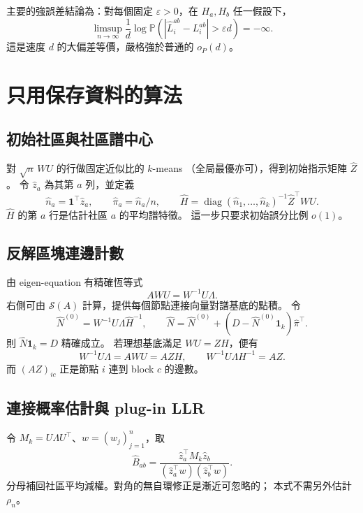 \documentclass[11pt,a4paper]{article}
\theoremstyle{zhplain}
\numberwithin{equation}{section}
\newcommand{\PP}{\mathbb P}
\newcommand{\one}{\mathbf 1}
\newcommand{\diag}{\operatorname{diag}}
\newcommand{\cS}{\mathcal S}
\begin{document}
主要的強誤差結論為：對每個固定 \(\varepsilon>0\)，在 \(H_a,H_b\) 任一假設下，
\begin{equation}
 \limsup_{n\to\infty}\frac1d
 \log\PP\!\left(
   |\widehat L_i^{ab}-L_i^{ab}|>\varepsilon d
 \right)=-\infty.
 \label{eq:exp-equivalence}
\end{equation}
這是速度 \(d\) 的大偏差等價，嚴格強於普通的 \(o_P(d)\)。

\section{只用保存資料的算法}
\label{sec:algorithm}

\subsection{初始社區與社區譜中心}
對 \(\sqrt n\,WU\) 的行做固定近似比的 \(k\)-means
（全局最優亦可），得到初始指示矩陣 \(\hat Z\)。
令 \(\hat z_a\) 為其第 \(a\) 列，並定義
\begin{equation}
 \hat n_a=\one^\top\hat z_a,\qquad
 \hat\pi_a=\hat n_a/n,\qquad
 \hat H=\diag(\hat n_1,\ldots,\hat n_k)^{-1}\hat Z^\top WU.
 \label{eq:centroid}
\end{equation}
\(\hat H\) 的第 \(a\) 行是估計社區 \(a\) 的平均譜特徵。
這一步只要求初始誤分比例 \(o(1)\)。

\subsection{反解區塊連邊計數}
由 eigen-equation 有精確恆等式
\begin{equation}
 AWU=W^{-1}U\Lambda.
 \label{eq:eigen-identity}
\end{equation}
右側可由 \(\cS(A)\) 計算，提供每個節點連接向量對譜基底的點積。
令
\begin{equation}
 \hat N^{(0)}=W^{-1}U\Lambda\hat H^{-1},
 \qquad
 \hat N=\hat N^{(0)}
       +(D-\hat N^{(0)}\one_k)\hat\pi^\top.
 \label{eq:counts-estimator}
\end{equation}
則 \(\hat N\one_k=D\) 精確成立。
若理想基底滿足 \(WU=ZH\)，便有
\[
 W^{-1}U\Lambda=AWU=AZH,\qquad
 W^{-1}U\Lambda H^{-1}=AZ.
\]
而 \((AZ)_{ic}\) 正是節點 \(i\) 連到 block \(c\) 的邊數。

\subsection{連接概率估計與 plug-in LLR}
令 \(M_k=U\Lambda U^\top\)、\(w=(w_j)_{j=1}^n\)，取
\begin{equation}
 \hat B_{ab}
   =\frac{\hat z_a^\top M_k\hat z_b}
          {(\hat z_a^\top w)(\hat z_b^\top w)}.
 \label{eq:B-estimator}
\end{equation}
分母補回社區平均減權。對角的無自環修正是漸近可忽略的；
本式不需另外估計 \(\rho_n\)。
\end{document}
